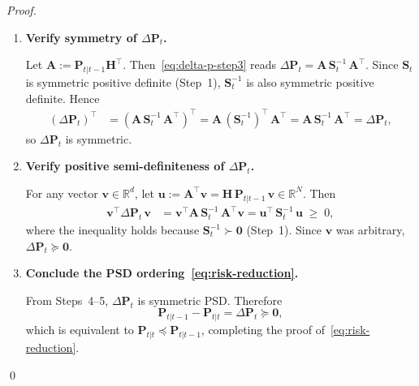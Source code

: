 \documentclass[12pt,openany]{book}
\numberwithin{equation}{chapter}
\theoremstyle{plain}
\theoremstyle{definition}
\theoremstyle{remark}
\begin{document}
\begin{proof}
\begin{enumerate}
  \item \textbf{Verify symmetry of $\Delta\mathbf{P}_t$.}

  Let $\mathbf{A} := \mathbf{P}_{t|t-1}\mathbf{H}^\top$.
  Then~\eqref{eq:delta-p-step3} reads
  $\Delta\mathbf{P}_t = \mathbf{A}\,\mathbf{S}_t^{-1}\,\mathbf{A}^\top$.
  Since $\mathbf{S}_t$ is symmetric positive definite
  (Step~1), $\mathbf{S}_t^{-1}$ is also symmetric positive definite.
  Hence
  \begin{align}
    (\Delta\mathbf{P}_t)^\top
    &= (\mathbf{A}\,\mathbf{S}_t^{-1}\,\mathbf{A}^\top)^\top
    = \mathbf{A}\,(\mathbf{S}_t^{-1})^\top\,\mathbf{A}^\top
    = \mathbf{A}\,\mathbf{S}_t^{-1}\,\mathbf{A}^\top
    = \Delta\mathbf{P}_t,
    \label{eq:delta-p-sym}
  \end{align}
  so $\Delta\mathbf{P}_t$ is symmetric.

  \item \textbf{Verify positive semi-definiteness of
        $\Delta\mathbf{P}_t$.}

  For any vector $\mathbf{v} \in \mathbb{R}^{d}$, let
  $\mathbf{u} := \mathbf{A}^\top\mathbf{v}
               = \mathbf{H}\,\mathbf{P}_{t|t-1}\,\mathbf{v}
               \in \mathbb{R}^{N}$.
  Then
  \begin{align}
    \mathbf{v}^\top \Delta\mathbf{P}_t\,\mathbf{v}
    &= \mathbf{v}^\top
       \mathbf{A}\,\mathbf{S}_t^{-1}\,\mathbf{A}^\top
       \mathbf{v}
    = \mathbf{u}^\top\,\mathbf{S}_t^{-1}\,\mathbf{u}
    \;\geq\; 0,
    \label{eq:delta-p-psd}
  \end{align}
  where the inequality holds because
  $\mathbf{S}_t^{-1} \succ \mathbf{0}$ (Step~1).
  Since $\mathbf{v}$ was arbitrary,
  $\Delta\mathbf{P}_t \succeq \mathbf{0}$.

  \item \textbf{Conclude the PSD ordering~\eqref{eq:risk-reduction}.}

  From Steps~4--5, $\Delta\mathbf{P}_t$ is symmetric PSD.
  Therefore
  \begin{equation}
    \mathbf{P}_{t|t-1} - \mathbf{P}_{t|t}
    = \Delta\mathbf{P}_t \succeq \mathbf{0},
  \end{equation}
  which is equivalent to
  $\mathbf{P}_{t|t} \preceq \mathbf{P}_{t|t-1}$,
  completing the proof of~\eqref{eq:risk-reduction}.

\end{enumerate}
\qed
\end{proof}
\end{document}

